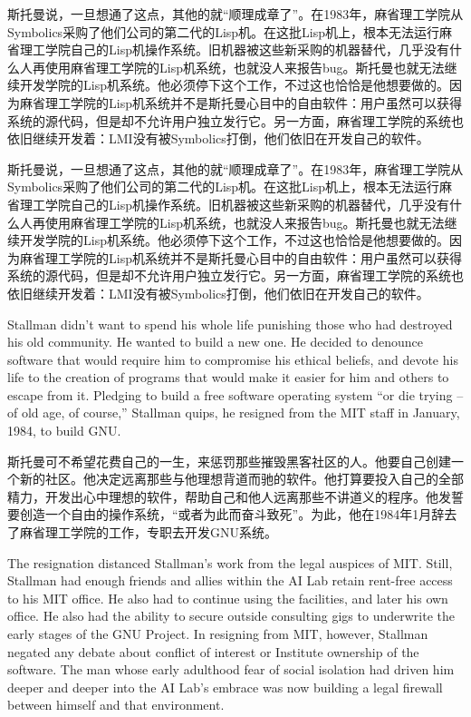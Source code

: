 \ifdefined\chs
\ifdefined\vone
斯托曼说，一旦想通了这点，其他的就``顺理成章了''。在1983年，麻省理工学院从Symbolics采购了他们公司的第二代的Lisp机。在这批Lisp机上，根本无法运行麻省理工学院自己的Lisp机操作系统。旧机器被这些新采购的机器替代，几乎没有什么人再使用麻省理工学院的Lisp机系统，也就没人来报告bug。斯托曼也就无法继续开发学院的Lisp机系统。他必须停下这个工作，不过这也恰恰是他想要做的。因为麻省理工学院的Lisp机系统并不是斯托曼心目中的自由软件：用户虽然可以获得系统的源代码，但是却不允许用户独立发行它。另一方面，麻省理工学院的系统也依旧继续开发着：LMI没有被Symbolics打倒，他们依旧在开发自己的软件。
\fi

\ifdefined\vtwo
斯托曼说，一旦想通了这点，其他的就``顺理成章了''。在1983年，麻省理工学院从Symbolics采购了他们公司的第二代的Lisp机。在这批Lisp机上，根本无法运行麻省理工学院自己的Lisp机操作系统。旧机器被这些新采购的机器替代，几乎没有什么人再使用麻省理工学院的Lisp机系统，也就没人来报告bug。斯托曼也就无法继续开发学院的Lisp机系统。他必须停下这个工作，不过这也恰恰是他想要做的。因为麻省理工学院的Lisp机系统并不是斯托曼心目中的自由软件：用户虽然可以获得系统的源代码，但是却不允许用户独立发行它。另一方面，麻省理工学院的系统也依旧继续开发着：LMI没有被Symbolics打倒，他们依旧在开发自己的软件。
\fi
\fi

\ifdefined\vtwo
\ifdefined\eng
Stallman didn't want to spend his whole life punishing those who had destroyed his old community.  He wanted to build a new one. He decided to denounce software that would require him to compromise his ethical beliefs, and devote his life to the creation of programs that would make it easier for him and others to escape from it. Pledging to build a free software operating system ``or die trying -- of old age, of course,'' Stallman quips, he resigned from the MIT staff in January, 1984, to build GNU.
\fi

\ifdefined\chs
斯托曼可不希望花费自己的一生，来惩罚那些摧毁黑客社区的人。他要自己创建一个新的社区。他决定远离那些与他理想背道而驰的软件。他打算要投入自己的全部精力，开发出心中理想的软件，帮助自己和他人远离那些不讲道义的程序。他发誓要创造一个自由的操作系统，``或者为此而奋斗致死''。为此，他在1984年1月辞去了麻省理工学院的工作，专职去开发GNU系统。
\fi
\fi

\ifdefined\eng
The resignation distanced Stallman's work from the legal auspices of MIT. Still, Stallman had enough friends and allies within the AI Lab \ifdefined\vone retain rent-free access to his MIT office. He also had \fi\ifdefined\vtwo to continue using the facilities, and later his own office. He also had the \fi ability to secure outside consulting gigs to underwrite the early stages of the GNU Project. In resigning from MIT, however, Stallman negated any debate about conflict of interest or Institute ownership of the software. The man whose early adulthood fear of social isolation had driven him deeper and deeper into the AI Lab's embrace was now building a legal firewall between himself and that environment.
\fi

